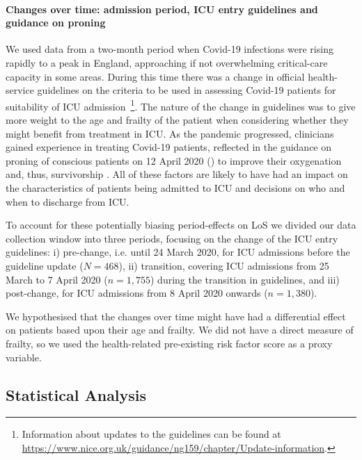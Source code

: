 \documentclass[review]{elsarticle}
\begin{document}
\paragraph{Changes over time: admission period, ICU entry guidelines and guidance on proning} We used data from a two-month period when Covid-19 infections were rising rapidly to a peak in England, approaching if not overwhelming critical-care capacity in some areas. During this time there was a change in official health-service guidelines on the criteria to be used in assessing Covid-19 patients for suitability of ICU admission~\cite{nice2020}\footnote{Information about updates to the guidelines can be found at \url{https://www.nice.org.uk/guidance/ng159/chapter/Update-information}.}. The nature of the change in guidelines was to give more weight to the age and frailty of the patient when considering whether they might benefit from treatment in ICU. As the pandemic progressed, clinicians gained experience in treating Covid-19 patients, reflected in the guidance on proning of conscious patients on 12 April 2020 (\cite{bamford2020ics}) to improve their oxygenation and, thus, survivorship \citep{alhazzani2020surviving}. All of these factors are likely to have had an impact on the characteristics of patients being admitted to ICU and decisions on who and when to discharge from ICU. 

To account for these potentially biasing period-effects on LoS we divided our data collection window into three periods, focusing on the change of the ICU entry guidelines: i) pre-change, i.e. until 24 March 2020, for ICU admissions before the guideline update ($N = 468$), ii) transition, covering ICU admissions from 25 March to 7 April 2020 ($n = 1,755$) during the transition in guidelines, and iii) post-change, for ICU admissions from  8 April 2020 onwards ($n = 1,380$). 

We hypothesised that the changes over time might have had a differential effect on patients based upon their age and frailty. We did not have a direct measure of frailty, so we used the health-related pre-existing risk factor score as a proxy variable. 



\subsection{Statistical Analysis}
\end{document}
